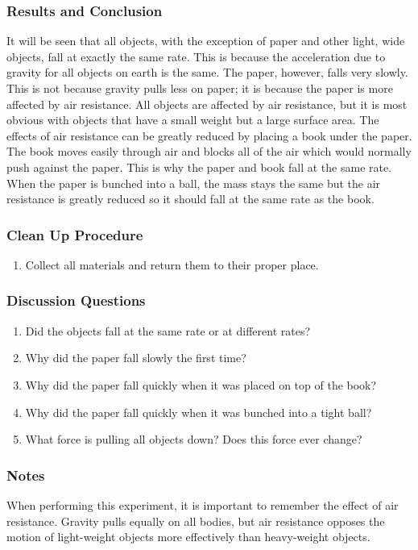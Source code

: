 \subsubsection*{Results and Conclusion}
It will be seen that all objects, with the exception of paper and other light, wide objects, fall at exactly the same rate. This is because the acceleration due to gravity for all objects on earth is the same.  
The paper, however, falls very slowly. This is not because gravity pulls less on paper; it is because the paper is more affected by air resistance. All objects are affected by air resistance, but it is most obvious with objects that have a small weight but a large surface area. The effects of air resistance can be greatly reduced by placing a book under the paper. The book moves easily through air and blocks all of the air which would normally push against the paper. This is why the paper and book fall at the same rate.  When the paper is bunched into a ball, the mass stays the same but the air resistance is greatly reduced so it should fall at the same rate as the book.

\subsubsection*{Clean Up Procedure}
\begin{enumerate}
\item{Collect all materials and return them to their proper place.} 
\end{enumerate}

\subsubsection*{Discussion Questions}
\begin{enumerate}
\item{Did the objects fall at the same rate or at different rates?}
\item{Why did the paper fall slowly the first time?}
\item{Why did the paper fall quickly when it was placed on top of the book?}
\item{Why did the paper fall quickly when it was bunched into a tight ball?}
\item{What force is pulling all objects down? Does this force ever change?}
\end{enumerate}

\subsubsection*{Notes}
When performing this experiment, it is important to remember the effect of air resistance.  Gravity pulls equally on all bodies, but air resistance opposes the motion of light-weight objects more effectively than heavy-weight objects.

